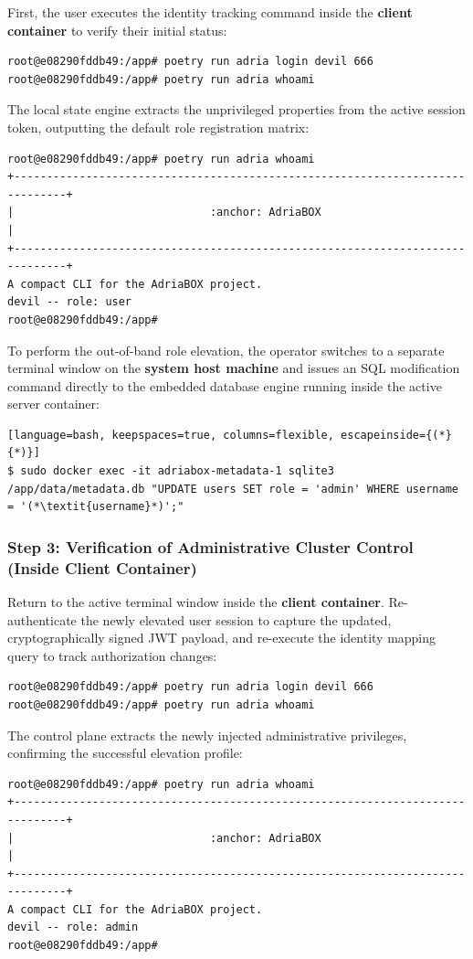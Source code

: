 First, the user executes the identity tracking command inside the \textbf{client container} to verify their initial status:
\begin{lstlisting}[language=bash, keepspaces=true, columns=flexible]
root@e08290fddb49:/app# poetry run adria login devil 666
root@e08290fddb49:/app# poetry run adria whoami
\end{lstlisting}
The local state engine extracts the unprivileged properties from the active session token, outputting the default role registration matrix:
\begin{lstlisting}[basicstyle=\small\ttfamily, frame=single, keepspaces=true, columns=flexible]
root@e08290fddb49:/app# poetry run adria whoami
+------------------------------------------------------------------------------+
|                              :anchor: AdriaBOX                               |
+------------------------------------------------------------------------------+
A compact CLI for the AdriaBOX project.                                         
devil -- role: user
root@e08290fddb49:/app# 
\end{lstlisting}

To perform the out-of-band role elevation, the operator switches to a separate terminal window on the \textbf{system host machine} and issues an SQL modification command directly to the embedded database engine running inside the active server container:
\begin{lstlisting}[language=bash, keepspaces=true, columns=flexible, escapeinside={(*}{*)}]
$ sudo docker exec -it adriabox-metadata-1 sqlite3 /app/data/metadata.db "UPDATE users SET role = 'admin' WHERE username = '(*\textit{username}*)';"
\end{lstlisting}

\subsubsection{Step 3: Verification of Administrative Cluster Control (Inside Client Container)}
Return to the active terminal window inside the \textbf{client container}. Re-authenticate the newly elevated user session to capture the updated, cryptographically signed JWT payload, and re-execute the identity mapping query to track authorization changes:
\begin{lstlisting}[language=bash, keepspaces=true, columns=flexible]
root@e08290fddb49:/app# poetry run adria login devil 666
root@e08290fddb49:/app# poetry run adria whoami
\end{lstlisting}
The control plane extracts the newly injected administrative privileges, confirming the successful elevation profile:
\begin{lstlisting}[basicstyle=\small\ttfamily, frame=single, keepspaces=true, columns=flexible]
root@e08290fddb49:/app# poetry run adria whoami
+------------------------------------------------------------------------------+
|                              :anchor: AdriaBOX                               |
+------------------------------------------------------------------------------+
A compact CLI for the AdriaBOX project.                                         
devil -- role: admin
root@e08290fddb49:/app# 
\end{lstlisting}


